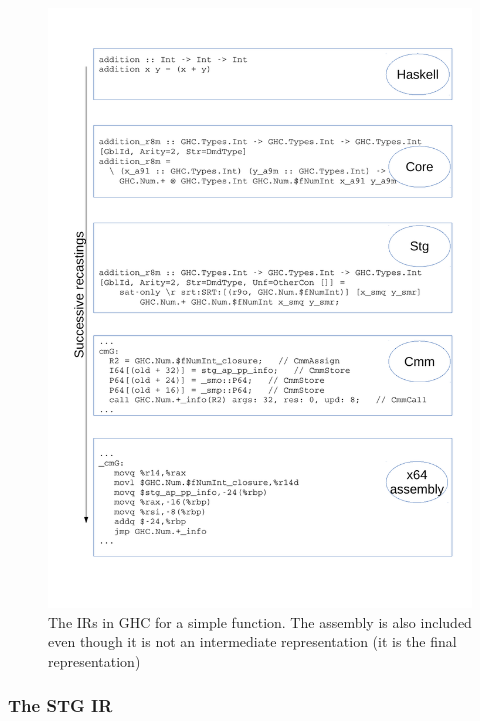 \begin{figure}
\begin{mdframed}
  \centering
  \includegraphics[width=5.5in]{fig/recastings}
  \caption{The IRs in GHC for a simple function. The assembly is also
  included even though it is not an intermediate representation (it is
  the final representation)}\label{fig:recastings}
\end{mdframed}
\end{figure}

\subsubsection{The STG IR}

